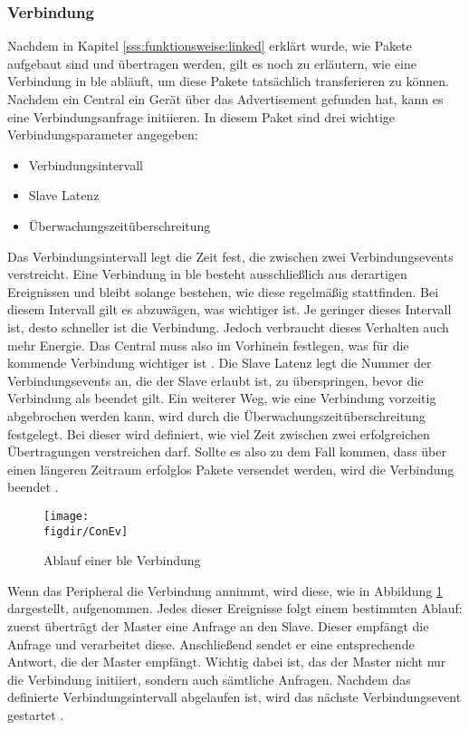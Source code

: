 \subsubsection{Verbindung}
\label{sss:funktionsweise:verbindung}

Nachdem in Kapitel \ref{sss:funktionsweise:linked} erklärt wurde, wie Pakete aufgebaut sind und übertragen werden, gilt es noch zu erläutern, wie eine Verbindung in \ac{ble} abläuft, um diese Pakete tatsächlich transferieren zu können. Nachdem ein Central ein Gerät über das Advertisement gefunden hat, kann es eine Verbindungsanfrage initiieren. In diesem Paket sind drei wichtige Verbindungsparameter angegeben:
\begin{itemize}
	\item{Verbindungsintervall}
	\item{Slave Latenz}
	\item{Überwachungszeitüberschreitung}
\end{itemize}
Das Verbindungsintervall legt die Zeit fest, die zwischen zwei Verbindungsevents verstreicht. Eine Verbindung in \ac{ble} besteht ausschließlich aus derartigen Ereignissen und bleibt solange bestehen, wie diese regelmäßig stattfinden. Bei diesem Intervall gilt es abzuwägen, was wichtiger ist. Je geringer dieses Intervall ist, desto schneller ist die Verbindung. Jedoch verbraucht dieses Verhalten auch mehr Energie. Das Central muss also im Vorhinein festlegen, was für die kommende Verbindung wichtiger ist \cite{CON:WWW}. Die Slave Latenz legt die Nummer der Verbindungsevents an, die der Slave erlaubt ist, zu überspringen, bevor die Verbindung als beendet gilt. Ein weiterer Weg, wie eine Verbindung vorzeitig abgebrochen werden kann, wird durch die Überwachungszeitüberschreitung festgelegt. Bei dieser wird definiert, wie viel Zeit zwischen zwei erfolgreichen Übertragungen verstreichen darf. Sollte es also zu dem Fall kommen, dass über einen längeren Zeitraum erfolglos Pakete versendet werden, wird die Verbindung beendet \cite[Seite 23]{Townsend14:GSB}.\\

\begin{figure}[h]
	\centering
	\texttt{[image: \\figdir/ConEv]}
	\caption{Ablauf einer \ac{ble} Verbindung \cite{CON:WWW}}
	\label{FIG:conenv}
\end{figure}

\noindent Wenn das Peripheral die Verbindung annimmt, wird diese, wie in Abbildung \ref{FIG:conenv} dargestellt, aufgenommen. Jedes dieser Ereignisse folgt einem bestimmten Ablauf: zuerst überträgt der Master eine Anfrage an den Slave. Dieser empfängt die Anfrage und verarbeitet diese. Anschließend sendet er eine entsprechende Antwort, die der Master empfängt. Wichtig dabei ist, das der Master nicht nur die Verbindung initiiert, sondern auch sämtliche Anfragen. Nachdem das definierte Verbindungsintervall abgelaufen ist, wird das nächste Verbindungsevent gestartet \cite{CON:WWW}.\\       

